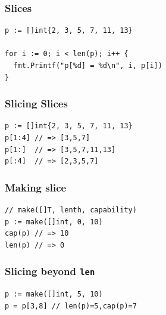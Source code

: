 \documentclass[xetex,mathserif,serif,12pt]{beamer}
\begin{document}
\begin{frame}[fragile]
  \frametitle{Slices}

  \begin{beamer@nomargin}
    \begin{lstlisting}
p := []int{2, 3, 5, 7, 11, 13}

for i := 0; i < len(p); i++ {
  fmt.Printf("p[%d] = %d\n", i, p[i])
}
    \end{lstlisting}
  \end{beamer@nomargin}
\end{frame}

\begin{frame}[fragile]
  \frametitle{Slicing Slices}

  \begin{beamer@nomargin}
    \begin{lstlisting}
p := []int{2, 3, 5, 7, 11, 13}
p[1:4] // => [3,5,7]
p[1:]  // => [3,5,7,11,13]
p[:4]  // => [2,3,5,7]
    \end{lstlisting}
  \end{beamer@nomargin}
\end{frame}

\begin{frame}[fragile]
  \frametitle{Making slice}

  \begin{beamer@nomargin}
    \begin{lstlisting}
// make([]T, lenth, capability)
p := make([]int, 0, 10)
cap(p) // => 10
len(p) // => 0
    \end{lstlisting}
  \end{beamer@nomargin}
\end{frame}

\begin{frame}[fragile]
  \frametitle{Slicing beyond \texttt{len}}

  \begin{beamer@nomargin}
    \begin{lstlisting}
p := make([]int, 5, 10)
p = p[3,8] // len(p)=5,cap(p)=7
    \end{lstlisting}
  \end{beamer@nomargin}
\end{frame}
\end{document}
